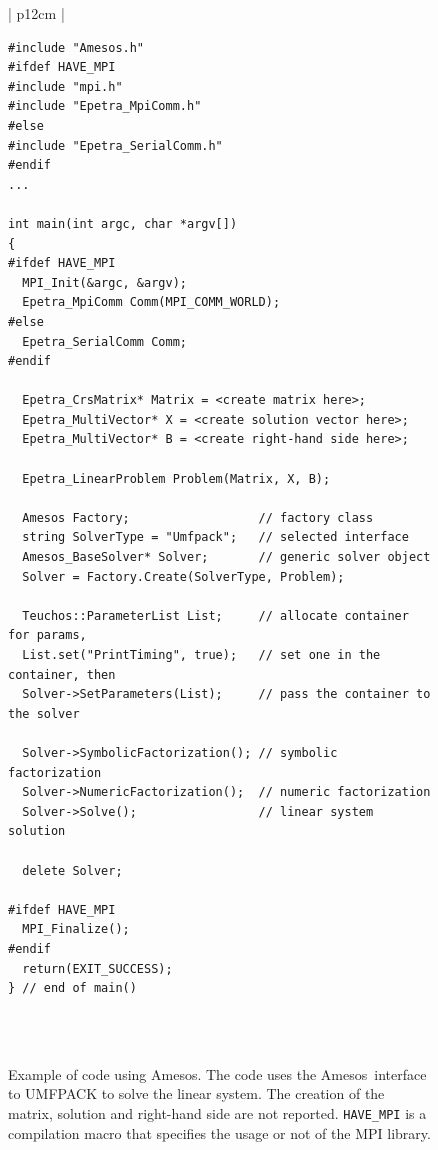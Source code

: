 \documentclass[acmtocl]{acmtrans2m}
\newcommand{\amesos}{{\sc Amesos}}
\begin{document}
\begin{figure}
\begin{center}
\begin{tabular}{| p{12cm} | }
\hline
 \\
\begin{minipage}{12cm}
\begin{verbatim}
#include "Amesos.h"
#ifdef HAVE_MPI
#include "mpi.h"
#include "Epetra_MpiComm.h"
#else
#include "Epetra_SerialComm.h"
#endif
...

int main(int argc, char *argv[]) 
{
#ifdef HAVE_MPI
  MPI_Init(&argc, &argv);
  Epetra_MpiComm Comm(MPI_COMM_WORLD);
#else
  Epetra_SerialComm Comm;
#endif

  Epetra_CrsMatrix* Matrix = <create matrix here>;
  Epetra_MultiVector* X = <create solution vector here>;
  Epetra_MultiVector* B = <create right-hand side here>; 

  Epetra_LinearProblem Problem(Matrix, X, B);

  Amesos Factory;                  // factory class
  string SolverType = "Umfpack";   // selected interface
  Amesos_BaseSolver* Solver;       // generic solver object
  Solver = Factory.Create(SolverType, Problem);

  Teuchos::ParameterList List;     // allocate container for params,
  List.set("PrintTiming", true);   // set one in the container, then
  Solver->SetParameters(List);     // pass the container to the solver

  Solver->SymbolicFactorization(); // symbolic factorization
  Solver->NumericFactorization();  // numeric factorization
  Solver->Solve();                 // linear system solution

  delete Solver;
    
#ifdef HAVE_MPI
  MPI_Finalize();
#endif
  return(EXIT_SUCCESS);
} // end of main()
\end{verbatim}
\end{minipage} \\
 \\
 \hline
\end{tabular}
\caption{Example of code using \amesos. The code uses the \amesos\ interface to
  UMFPACK to solve the linear system. The creation of the matrix, solution and
    right-hand side are not reported. {\tt HAVE\_MPI} is a compilation macro
    that specifies the usage or not of the MPI library.}
\label{fig:example}
\end{center}
\end{figure}
\end{document}
